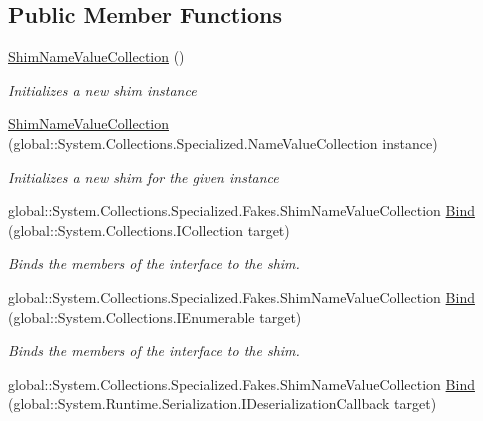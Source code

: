 \subsection*{Public Member Functions}
\begin{DoxyCompactItemize}
\item 
\hyperlink{class_system_1_1_collections_1_1_specialized_1_1_fakes_1_1_shim_name_value_collection_a7bb617c3d0b96eeccbc2632d4d621706}{Shim\-Name\-Value\-Collection} ()
\begin{DoxyCompactList}\small\item\em Initializes a new shim instance\end{DoxyCompactList}\item 
\hyperlink{class_system_1_1_collections_1_1_specialized_1_1_fakes_1_1_shim_name_value_collection_a50b594e9aa607df3b9cd9abfe75de9cb}{Shim\-Name\-Value\-Collection} (global\-::\-System.\-Collections.\-Specialized.\-Name\-Value\-Collection instance)
\begin{DoxyCompactList}\small\item\em Initializes a new shim for the given instance\end{DoxyCompactList}\item 
global\-::\-System.\-Collections.\-Specialized.\-Fakes.\-Shim\-Name\-Value\-Collection \hyperlink{class_system_1_1_collections_1_1_specialized_1_1_fakes_1_1_shim_name_value_collection_afa18f4a69308b5c59301353b122ee03e}{Bind} (global\-::\-System.\-Collections.\-I\-Collection target)
\begin{DoxyCompactList}\small\item\em Binds the members of the interface to the shim.\end{DoxyCompactList}\item 
global\-::\-System.\-Collections.\-Specialized.\-Fakes.\-Shim\-Name\-Value\-Collection \hyperlink{class_system_1_1_collections_1_1_specialized_1_1_fakes_1_1_shim_name_value_collection_a0b3364ab460feaa9695c0a9082658605}{Bind} (global\-::\-System.\-Collections.\-I\-Enumerable target)
\begin{DoxyCompactList}\small\item\em Binds the members of the interface to the shim.\end{DoxyCompactList}\item 
global\-::\-System.\-Collections.\-Specialized.\-Fakes.\-Shim\-Name\-Value\-Collection \hyperlink{class_system_1_1_collections_1_1_specialized_1_1_fakes_1_1_shim_name_value_collection_acdae1966a5f4315fd4596b00afb22c9f}{Bind} (global\-::\-System.\-Runtime.\-Serialization.\-I\-Deserialization\-Callback target)

\end{DoxyCompactItemize}
